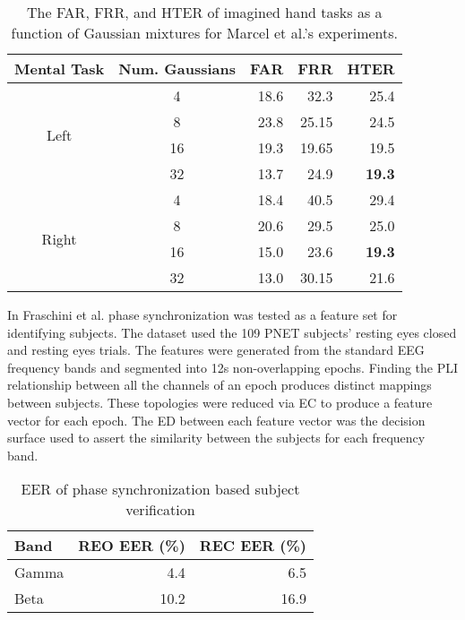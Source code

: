 \begin{table}[ht]
\centering
\caption[Imagined Activity HTER]{The FAR, FRR, and HTER of imagined hand tasks as a function of Gaussian mixtures for Marcel et al.'s experiments.}
\begin{tabular}{|c|c| r r r|}
								\hline
\multicolumn{1}{|l|}{Mental Task} 	& Num. Gaussians 	& FAR 	& FRR 	& HTER \\
								\hline
\multirow{4}{*}{Left} 				& 4 				& 18.6 	& 32.3 	& 25.4 \\
                           			& 8 				& 23.8 	& 25.15 	& 24.5 \\
                            		& 16 			& 19.3 	& 19.65 	& 19.5 \\
                               		& 32 			& 13.7 	& 24.9 	& \textbf{19.3} \\
                               		\hline
\multirow{4}{*}{Right} 			& 4 				& 18.4 	& 40.5 	& 29.4 \\
                               		& 8 				& 20.6 	& 29.5 	& 25.0 \\
                                	& 16 			& 15.0 	& 23.6 	& \textbf{19.3} \\
                              		& 32 			& 13.0 	& 30.15 	& 21.6 \\
                                	\hline
\end{tabular}
\label{tbl:marcel}
\end{table}

In Fraschini et al.\cite{Fraschini2015} phase synchronization was tested as a feature set for identifying subjects. The dataset used the 109 \ac{PNET} subjects' resting eyes closed and resting eyes trials. The features were generated from the standard \ac{EEG} frequency bands and segmented into 12s non-overlapping epochs. Finding the \ac{PLI} relationship between all the channels of an epoch produces distinct mappings between subjects. These topologies were reduced via \ac{EC} to produce a feature vector for each epoch. The \ac{ED} between each feature vector was the decision surface used to assert the similarity between the subjects for each frequency band.

\begin{table}[ht]
\centering
\caption{EER of phase synchronization based subject verification}
\begin{tabular}{l r r}
\toprule
Band & REO EER (\%) & REC EER (\%) \\ \midrule
Gamma & 4.4 & 6.5 \\
Beta & 10.2 & 16.9 \\
\bottomrule
\end{tabular}
\label{tbl:fraschini}
\end{table}

